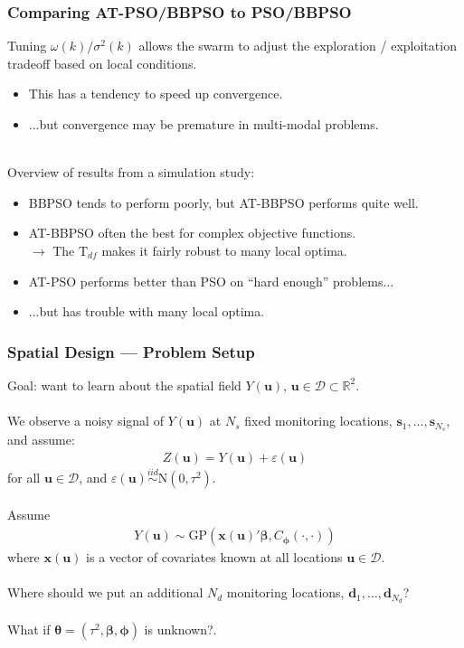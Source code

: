 \documentclass[xcolor=dvipsnames]{beamer}
\begin{document}
\begin{frame}
\frametitle{Comparing AT-PSO/BBPSO to PSO/BBPSO}
Tuning $\omega(k)/\sigma^2(k)$ allows the swarm to adjust the exploration / exploitation tradeoff based on local conditions.
\begin{itemize}
\item This has a tendency to speed up convergence.
\item ...but convergence may be premature in multi-modal problems.\\~\\
\end{itemize}

\pause

Overview of results from a simulation study:
\begin{itemize}
\item BBPSO tends to perform poorly, but AT-BBPSO performs quite well.\\
\item AT-BBPSO often the best for complex objective functions.\\
$\to$ The $\mathrm{T}_{df}$ makes it fairly robust to many local optima.\pause
\item AT-PSO performs better than PSO on ``hard enough'' problems... \pause
\item ...but has trouble with many local optima.
\end{itemize}
\end{frame}

\begin{frame}
\frametitle{Spatial Design --- Problem Setup}
Goal: want to learn about the spatial field $Y(\bm{u})$, $\bm{u}\in\mathcal{D}\subset \mathbb{R}^2$. \pause\\~\\

We observe a noisy signal of $Y(\bm{u})$ at $N_s$ fixed monitoring locations, $\bm{s}_1, \dots, \bm{s}_{N_s}$,
and assume:
\begin{align*}
Z(\bm{u}) = Y(\bm{u}) + \varepsilon(\bm{u})
\end{align*}
for all $\bm{u}\in\mathcal{D}$, and $\varepsilon(\bm{u}) \stackrel{iid}{\sim} \mathrm{N}(0, \tau^2)$. \pause\\~\\

Assume
\begin{align*}
Y(\bm{u}) \sim \mathrm{GP}(\bm{x}(\bm{u})'\bm{\beta}, C_{\bm{\phi}}(\cdot, \cdot))
\end{align*}
where $\bm{x}(\bm{u})$ is a vector of covariates known at all locations $\bm{u}\in\mathcal{D}$. \pause \\~\\

Where should we put an additional $N_d$ monitoring locations, $\bm{d}_1, \dots, \bm{d}_{N_d}$? \pause \\~\\

What if $\bm{\theta} = (\tau^2, \bm{\beta}, \bm{\phi})$ is unknown?.
\end{frame}
\end{document}
